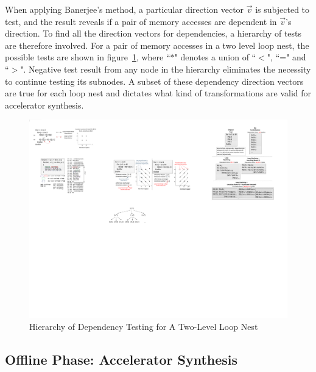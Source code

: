 When applying Banerjee's method, a particular direction vector $\vec{v}$ is subjected to test, and the result reveals if a pair of memory accesses are dependent in $\vec{v}$'s direction. 
To find all the direction vectors for dependencies, a hierarchy
of tests are therefore involved. For a pair of memory accesses in a two level loop nest, the possible tests are shown in figure~\ref{fig:testingHier}, where ``$\ast$" denotes a union of ``$<$", ``=" and ``$>$". Negative test result from any node in the hierarchy eliminates the necessity to continue testing its subnodes. A subset of these dependency direction vectors
are true for each loop nest and dictates what kind of transformations are valid for accelerator synthesis.


\begin{figure}[htp]
\begin{center}
\includegraphics[width=0.6\linewidth]{chap6fig/testingHier.pdf}
\caption{Hierarchy of Dependency Testing for A Two-Level Loop Nest
\label{fig:testingHier}}
\end{center}
\end{figure}



\subsection{Offline Phase: Accelerator Synthesis}

